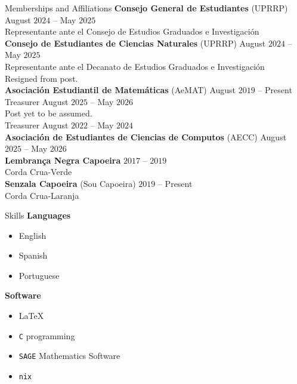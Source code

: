 \documentclass{resume}
\begin{document}
\begin{rSection}{Memberships and Affiliations}
  \textbf{Consejo General de Estudiantes} (UPRRP)
            \hfill August $2024$ -- May $2025$  \\
  Representante ante el Consejo de Estudios Graduados e
  Investigaci\'on \\

  \textbf{Consejo de Estudiantes de Ciencias Naturales} (UPRRP)
            \hfill August $2024$ -- May $2025$  \\
  Representante ante el Decanato de Estudios Graduados e
  Investigaci\'on \\
  {\footnotesize Resigned from post}.  \\

  \textbf{Asociaci\'on Estudiantil de Matem\'aticas} (AeMAT)
            \hfill August $2019$ -- Present \\
    Treasurer \hfill August $2025$ -- May $2026$ \\
    {\footnotesize Post yet to be assumed}.  \medskip \\
    Treasurer \hfill August $2022$ -- May $2024$ \\

  \textbf{Asociaci\'on de Estudiantes de Ciencias de Computos} (AECC)
            \hfill August $2025$ -- May  $2026$ \\

  \textbf{Lembran\c{c}a Negra Capoeira} \hfill $2017$ -- $2019$ \\
  Corda Crua-Verde  \\

  \textbf{Senzala Capoeira} (Sou Capoeira) \hfill $2019$ -- Present \\
  Corda Crua-Laranja  \\
\end{rSection}

\begin{rSection}{Skills}
  \textbf{Languages}
  \begin{itemize}
    \item[] English

    \item[] Spanish

    \item[] Portuguese
  \end{itemize}

  \textbf{Software}
  \begin{itemize}
    \item[] \LaTeX

    \item[] \lstinline{C} programming

    \item[] \lstinline{SAGE} Mathematics Software

    \item[] \lstinline{nix}
  \end{itemize}
\end{rSection}
\end{document}
